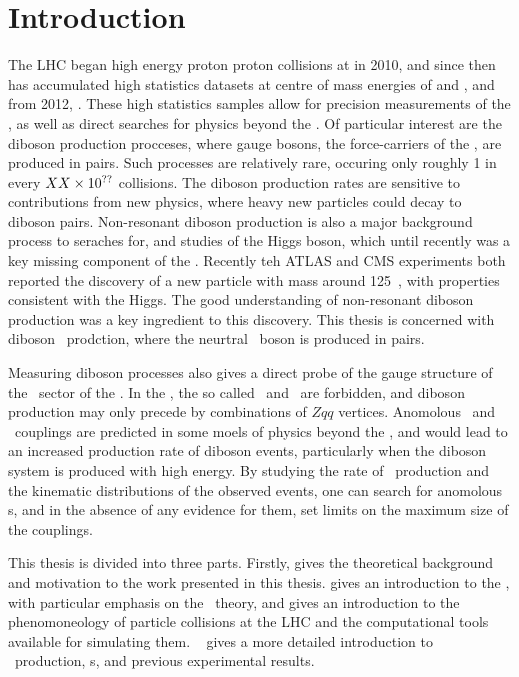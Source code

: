 \graphicspath{{Chapters/Introduction/Figures/}}

\chapter*{Introduction}
\label{chap:Introduction}

The LHC began high energy proton proton collisions at in 2010, and since then
has accumulated high statistics datasets at centre of mass energies of
and  , and from 2012, . These high statistics samples
allow for precision measurements of the \sm, as well as direct searches for
physics beyond the \sm. Of particular interest are the diboson production
procceses, where gauge bosons, the force-carriers of the \sm, are produced in
pairs. Such processes are relatively rare, occuring only roughly 1 in every
$XX\times 10 ^{??}$ collisions. The diboson production rates are sensitive to
contributions from new physics, where heavy new particles could decay to diboson
pairs. Non-resonant diboson production is also a major background process to
seraches for, and studies of the Higgs boson, which until recently was a key
missing component of the \sm. Recently teh ATLAS and CMS experiments both
reported the discovery of a new particle with mass around 125~\gev, with
properties consistent with the Higgs. The good understanding of non-resonant
diboson production was a key ingredient to this discovery. This thesis is
concerned with diboson \ZZ\ prodction, where the neurtral \Z\ boson is produced
in pairs.

Measuring diboson processes also gives a direct probe of the gauge structure of
the \ew\ sector of the \sm. In the \sm, the so called  \ZZZ\ and \ZZg\ are forbidden, and diboson production may
only precede by combinations of $Zqq$ vertices. Anomolous \ZZZ\ and \ZZg\ couplings are
predicted in some moels of physics beyond the \sm, and would lead to an
increased production rate of diboson events, particularly when the diboson
system is produced with high energy. By studying the rate of \ZZ\ production and
the kinematic distributions of the observed events, one can search for anomolous
\TGC s, and in the absence of any evidence for them, set limits on the maximum
size of the couplings.

This thesis is divided into three parts. Firstly,  gives the theoretical background
and motivation to the work presented in this thesis.  gives an
introduction to the \sm, with particular emphasis on the \ew\ theory, and gives
an introduction to the phenomoneology of particle collisions at the LHC and the
computational tools available for simulating them. ~ gives a more
detailed introduction to \ZZ\ production, \TGC s, and previous experimental
results.

